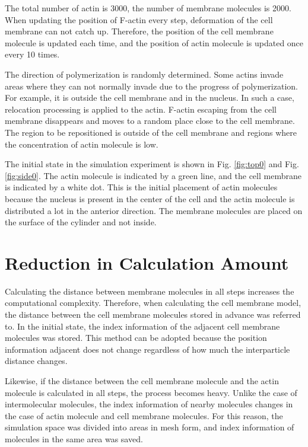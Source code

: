 \documentclass[a4paper,12pt, oneside]{book}
\begin{document}
The total number of actin is 3000, the number of membrane molecules is 2000. When updating the position of F-actin every step, deformation of the cell membrane can not catch up. Therefore, the position of the cell membrane molecule is updated each time, and the position of actin molecule is updated once every 10 times.

The direction of polymerization is randomly determined. Some actins invade areas where they can not normally invade due to the progress of polymerization. For example, it is outside the cell membrane and in the nucleus. In such a case, relocation processing is applied to the actin. F-actin escaping from the cell membrane disappears and moves to a random place close to the cell membrane. The region to be repositioned is outside of the cell membrane and regions where the concentration of actin molecule is low.

The initial state in the simulation experiment is shown in Fig. \ref{fig:top0} and Fig. \ref{fig:side0}. The actin molecule is indicated by a green line, and the cell membrane is indicated by a white dot. This is the initial placement of actin molecules because the nucleus is present in the center of the cell and the actin molecule is distributed a lot in the anterior direction. The membrane molecules are placed on the surface of the cylinder and not inside.

\section{Reduction in Calculation Amount}
Calculating the distance between membrane molecules in all steps increases the computational complexity.
Therefore, when calculating the cell membrane model, the distance between the cell membrane molecules stored in advance was referred to.
In the initial state, the index information of the adjacent cell membrane molecules was stored.
This method can be adopted because the position information adjacent does not change regardless of how much the interparticle distance changes.

Likewise, if the distance between the cell membrane molecule and the actin molecule is calculated in all steps, the process becomes heavy.
Unlike the case of intermolecular molecules, the index information of nearby molecules changes in the case of actin molecule and cell membrane molecules.
For this reason, the simulation space was divided into areas in mesh form, and index information of molecules in the same area was saved.
\end{document}
